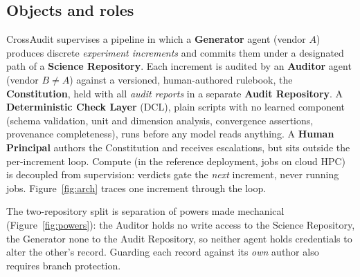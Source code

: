 \documentclass[11pt,letterpaper]{article}
\begin{document}
\subsection{Objects and roles}\label{sec:roles}

CrossAudit supervises a pipeline in which a \textbf{Generator} agent (vendor $A$) produces discrete \emph{experiment increments} and commits them under a designated path of a \textbf{Science Repository}. Each increment is audited by an \textbf{Auditor} agent (vendor $B \neq A$) against a versioned, human-authored rulebook, the \textbf{Constitution}, held with all \emph{audit reports} in a separate \textbf{Audit Repository}. A \textbf{Deterministic Check Layer} (DCL), plain scripts with no learned component (schema validation, unit and dimension analysis, convergence assertions, provenance completeness), runs before any model reads anything. A \textbf{Human Principal} authors the Constitution and receives escalations, but sits outside the per-increment loop. Compute (in the reference deployment, jobs on cloud HPC) is decoupled from supervision: verdicts gate the \emph{next} increment, never running jobs. Figure~\ref{fig:arch} traces one increment through the loop.

The two-repository split is separation of powers made mechanical (Figure~\ref{fig:powers}): the Auditor holds no write access to the Science Repository, the Generator none to the Audit Repository, so neither agent holds credentials to alter the other's record. Guarding each record against its \emph{own} author also requires branch protection.
\end{document}
